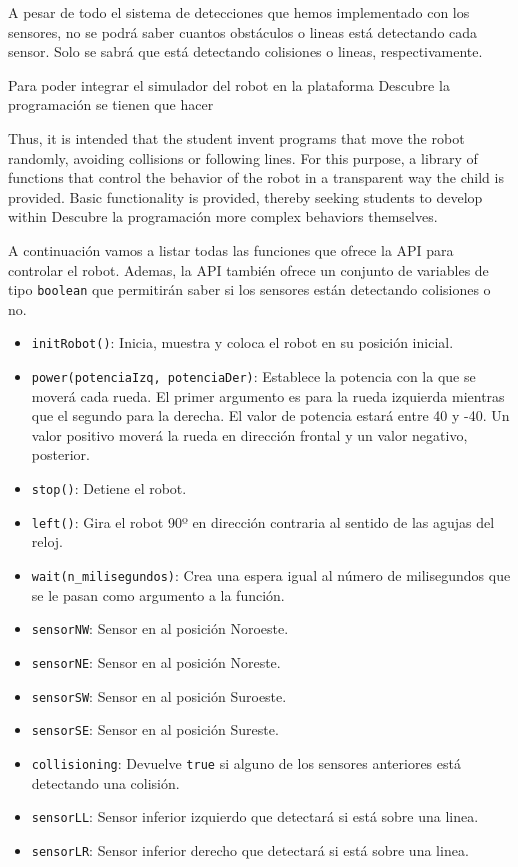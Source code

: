 A pesar de todo el sistema de detecciones que hemos implementado con los sensores, no se podrá saber cuantos obstáculos o lineas está detectando cada sensor. Solo se sabrá que está detectando colisiones o lineas, respectivamente. 


Para poder integrar el simulador del robot en la plataforma Descubre la programación se tienen que hacer




Thus, it is intended that the student invent programs that move the robot randomly, avoiding collisions or following lines. For this purpose, a library of functions that control the behavior of the robot in a transparent way the child is provided. Basic functionality is provided, thereby seeking students to develop within Descubre la programación more complex behaviors themselves. 

A continuación vamos a listar todas las funciones que ofrece la API para controlar el robot. Ademas, la API también ofrece un conjunto de variables de tipo \texttt{boolean} que permitirán saber si los sensores están detectando colisiones o no.

\begin{itemize}
	\item \texttt{initRobot()}: Inicia, muestra y coloca el robot en su posición inicial.
	\item \texttt{power(potenciaIzq, potenciaDer)}: Establece la potencia con la que se moverá cada rueda. El primer argumento es para la rueda izquierda mientras que el segundo para la derecha. El valor de potencia estará entre 40 y -40. Un valor positivo moverá la rueda en dirección frontal y un valor negativo, posterior.
	\item \texttt{stop()}: Detiene el robot.
	\item \texttt{left()}: Gira el robot 90º en dirección contraria al sentido de las agujas del reloj.
	\item \texttt{wait(n\_milisegundos)}: Crea una espera igual al número de milisegundos que se le pasan como argumento a la función. 
	\item \texttt{sensorNW}: Sensor en al posición Noroeste.
		\item \texttt{sensorNE}: Sensor en al posición Noreste.
			\item \texttt{sensorSW}: Sensor en al posición Suroeste.
				\item \texttt{sensorSE}: Sensor en al posición Sureste.
		\item \texttt{collisioning}: Devuelve \texttt{true} si alguno de los sensores anteriores está detectando una colisión.
			\item \texttt{sensorLL}: Sensor inferior izquierdo que detectará si está sobre una linea.
						\item \texttt{sensorLR}: Sensor inferior derecho que detectará si está sobre una linea.
\end{itemize}

